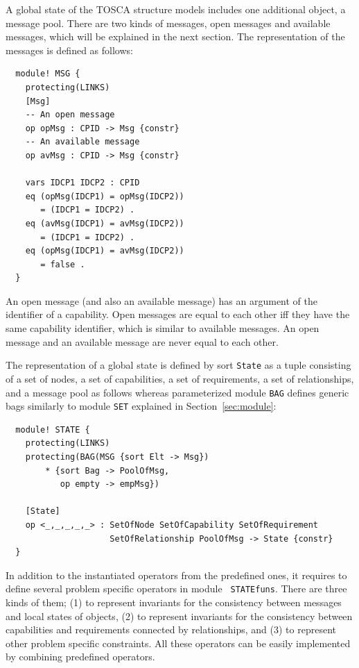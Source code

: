\documentclass[12pt]{report}
\begin{document}
A global state of the TOSCA structure models includes one additional
object, a message pool. There are two kinds of messages, open messages
and available messages, which will be explained in the next
section. The representation of the messages is defined as follows:
\small
\begin{verbatim}
  module! MSG {
    protecting(LINKS)
    [Msg]
    -- An open message
    op opMsg : CPID -> Msg {constr}
    -- An available message
    op avMsg : CPID -> Msg {constr}
  
    vars IDCP1 IDCP2 : CPID 
    eq (opMsg(IDCP1) = opMsg(IDCP2))
       = (IDCP1 = IDCP2) .
    eq (avMsg(IDCP1) = avMsg(IDCP2))
       = (IDCP1 = IDCP2) .
    eq (opMsg(IDCP1) = avMsg(IDCP2))
       = false .
  }    
\end{verbatim}
\normalsize
An open message (and also an available message) has an argument of the
identifier of a capability. Open messages are equal to each other iff
they have the same capability identifier, which is similar to
available messages. An open message and an available message are never
equal to each other.

The representation of a global state is defined by sort {\tt State} as
a tuple consisting of a set of nodes, a set of capabilities, a set of
requirements, a set of relationships, and a message pool as follows
whereas parameterized module {\tt BAG} defines generic bags similarly
to module {\tt SET} explained in Section~\ref{sec:module}:
\small
\begin{verbatim}
  module! STATE {
    protecting(LINKS)
    protecting(BAG(MSG {sort Elt -> Msg})
        * {sort Bag -> PoolOfMsg,
           op empty -> empMsg})
  
    [State]
    op <_,_,_,_,_> : SetOfNode SetOfCapability SetOfRequirement 
                     SetOfRelationship PoolOfMsg -> State {constr}
  }
\end{verbatim}
\normalsize

In addition to the instantiated operators from the predefined ones, it
requires to define several problem specific operators in module {\tt
  STATEfuns}. There are three kinds of them; (1) to represent
invariants for the consistency between messages and local states of
objects, (2) to represent invariants for the consistency between
capabilities and requirements connected by relationships, and (3) to
represent other problem specific constraints. All these operators can
be easily implemented by combining predefined operators.
\end{document}
